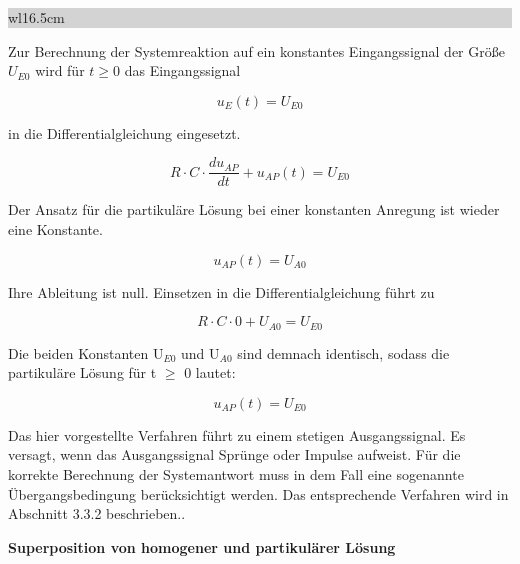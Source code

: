 \noindent
\colorbox{lightgray}{%
%
\renewcommand\arraystretch{0.6}%
\begin{tabular}{ wl{16.5cm} }
{\selectfont{
Beispiel: Einschwingverhalten eines RC-Netzwerks}}
\end{tabular}%
}\bigskip

\noindent Zur Berechnung der Systemreaktion auf ein konstantes Eingangssignal der Größe $U_{E0}$ wird für $t \geqslant 0$ das Eingangssignal

\begin{equation}\label{eq:seventyfour}
u_{E} \left(t\right)=U_{E0} 
\end{equation}

\noindent in die Differentialgleichung eingesetzt.

\begin{equation}\label{eq:seventyfive}
R\cdot C\cdot \frac{du_{AP} }{dt} +u_{AP} \left(t\right)=U_{E0} 
\end{equation}

\noindent Der Ansatz für die partikuläre Lösung bei einer konstanten Anregung ist wieder eine Konstante. 

\begin{equation}\label{eq:seventysix}
u_{AP} \left(t\right)=U_{A0}
\end{equation}

\noindent Ihre Ableitung ist null. Einsetzen in die Differentialgleichung führt zu

\begin{equation}\label{eq:seventyseven}
R\cdot C\cdot 0+U_{A0} =U_{E0}
\end{equation}

\noindent Die beiden Konstanten U$_{E0}$ und U$_{A0}$ sind demnach identisch, sodass die partikuläre Lösung für t $\geq$ 0 lautet:

\begin{equation}\label{eq:seventyeight}
u_{AP} \left(t\right)=U_{E0}
\end{equation}

\noindent Das hier vorgestellte Verfahren führt zu einem stetigen Ausgangssignal. Es versagt, wenn das Ausgangssignal Sprünge oder Impulse aufweist. Für die korrekte Berechnung der Systemantwort muss in dem Fall eine sogenannte Übergangsbedingung berücksichtigt werden. Das entsprechende Verfahren wird in Abschnitt 3.3.2 beschrieben..\bigskip

{\selectfont
\noindent\textbf{Superposition von homogener und partikulärer Lösung}}\smallskip

